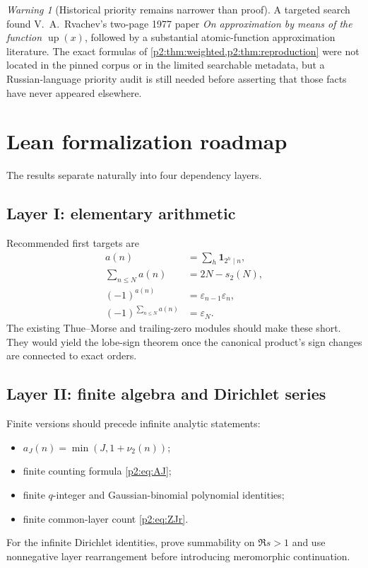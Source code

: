 \documentclass[11pt]{article}
\numberwithin{equation}{section}
\theoremstyle{definition}
\theoremstyle{remark}
\newtheorem{warning}[theorem]{Warning}
\newcommand{\Up}{\operatorname{up}}
\begin{document}
\begin{warning}[Historical priority remains narrower than proof]
A targeted search found V.~A.~Rvachev's two-page 1977 paper \emph{On approximation
by means of the function $\Up(x)$}, followed by a substantial atomic-function
approximation literature.  The exact formulas of \cref{p2:thm:weighted,p2:thm:reproduction}
were not located in the pinned corpus or in the limited searchable metadata, but
a Russian-language priority audit is still needed before asserting that those
facts have never appeared elsewhere.
\end{warning}

\section{Lean formalization roadmap}
\label{p2:sec:lean}

The results separate naturally into four dependency layers.

\subsection{Layer I: elementary arithmetic}

Recommended first targets are
\begin{align*}
 a(n)&=\sum_h\mathbf1_{2^h\mid n},\\
 \sum_{n\le N}a(n)&=2N-s_2(N),\\
 (-1)^{a(n)}&=\varepsilon_{n-1}\varepsilon_n,\\
 (-1)^{\sum_{n\le N}a(n)}&=\varepsilon_N.
\end{align*}
The existing Thue--Morse and trailing-zero modules should make these short.
They would yield the lobe-sign theorem once the canonical product's sign changes
are connected to exact orders.

\subsection{Layer II: finite algebra and Dirichlet series}

Finite versions should precede infinite analytic statements:
\begin{itemize}
\item $a_J(n)=\min(J,1+\nu_2(n))$;
\item finite counting formula \eqref{p2:eq:AJ};
\item finite $q$-integer and Gaussian-binomial polynomial identities;
\item finite common-layer count \eqref{p2:eq:ZJr}.
\end{itemize}
For the infinite Dirichlet identities, prove summability on $\Re s>1$ and use
nonnegative layer rearrangement before introducing meromorphic continuation.
\end{document}
